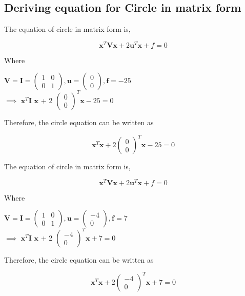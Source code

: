 \documentclass[journal,12pt,twocolumn]{article}
\let\vec\mathbf
\newcommand{\myvec}[1]{\ensuremath{\begin{pmatrix}#1\end{pmatrix}}}
\begin{document}
\subsection{Deriving equation for Circle in matrix form}
\vspace{0.2cm}
\begin{flushleft}
The equation of circle in matrix form is,\\
\vspace{0.25cm}
\end{flushleft}
\vspace{0.25cm}
\begin{equation}
 \vec{x}^T \vec{V} \vec{x} + 2 \vec{u}^T \vec{x} + f = 0
\end{equation}
\begin{flushleft}
Where\\
\end{flushleft}
\center
$\vec{V} = \vec{I}= \myvec{ 1 & 0\\ 0 & 1} , \vec{u} = \myvec{0 \\ 0}, \vec{f}=-25$\\
\endcenter
\center
  $\implies$  $ \vec{x}^T$$\vec{I}$ $\vec{x}$  + 2 $ \myvec{0\\0}^T \vec{x} -25 = 0$
\endcenter
\begin{flushleft}
\vspace{0.23cm}
Therefore, the circle equation can be written as
\end{flushleft}
\begin{equation}
    \vec{x}^T \vec{x} + 2 \myvec{0\\0}^T \vec{x} -25= 0
\end{equation}
\endcenter
\begin{flushleft}
The equation of circle in matrix form is,\\
\vspace{0.25cm}
\end{flushleft}
\vspace{0.25cm}
\begin{equation}
 \vec{x}^T \vec{V} \vec{x} + 2 \vec{u}^T \vec{x} + f = 0
\end{equation}
\begin{flushleft}
Where\\
\end{flushleft}
\center
$\vec{V} = \vec{I}= \myvec{ 1 & 0\\ 0 & 1} , \vec{u} = \myvec{-4 \\ 0}, \vec{f}=7$\\  \vspace{10mm}
\endcenter
\center
  $\implies$  $ \vec{x}^T$$\vec{I}$ $\vec{x}$  + 2 $ \myvec{-4\\0}^T \vec{x} +7= 0$
\endcenter
\begin{flushleft}
\vspace{0.23cm}
Therefore, the circle equation can be written as
\end{flushleft}
\begin{equation}
    \vec{x}^T \vec{x} + 2 \myvec{-4\\0}^T \vec{x} +7= 0
\end{equation}
\end{document}
